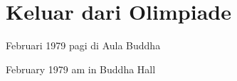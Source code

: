 \chapter{Keluar dari Olimpiade} %

 Februari 1979 pagi di Aula Buddha

 February 1979 am in Buddha Hall
